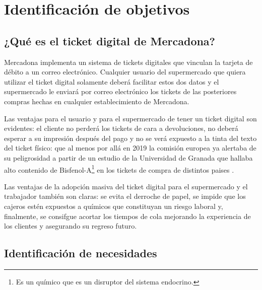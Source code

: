 \documentclass[a4paper,12pt]{report}
\begin{document}
	
	\tableofcontents
	\newpage
	
	
	
	
	
	
	
	
	\begingroup
	\setlength{\parskip}{.7em}
	
	
	
	
	\chapter{Identificación de objetivos}

		\section{¿Qué es el ticket digital de Mercadona?}
		
		Mercadona implementa un sistema de tickets digitales que vinculan la tarjeta de débito a un correo electrónico. Cualquier usuario del supermercado que quiera utilizar el ticket digital solamente deberá facilitar estos dos datos y el supermercado le enviará por correo electrónico los tickets de las posteriores compras hechas en cualquier establecimiento de Mercadona.
		
		Las ventajas para el usuario y para el supermercado de tener un ticket digital son evidentes: el cliente no perderá los tickets de cara a devoluciones, no deberá esperar a su impresión después del pago y no se verá expuesto a la tinta del texto del ticket físico: que al menos por allá en 2019 la comisión europea ya alertaba de su peligrosidad \cite{EU_Parliament_2019} a partir de un estudio de la Universidad de Granada que hallaba alto contenido de Bisfenol-A\footnote{Es un químico que es un disruptor del sistema endocrino.} en los tickets de compra de distintos paises \cite{Molina-Molina2019}\cite{CanalUGR}.
		
		Las ventajas de la adopción masiva del ticket digital para el supermercado y el trabajador también son claras: se evita el derroche de papel, se impide que los cajeros estén expuestos a químicos que constituyan un riesgo laboral y, finalmente, se consifgue acortar los tiempos de cola mejorando la experiencia de los clientes y asegurando su regreso futuro.
		
		
		
		\section{Identificación de necesidades}
		\label{section:identificacionNecesidades}
		
\end{document}
